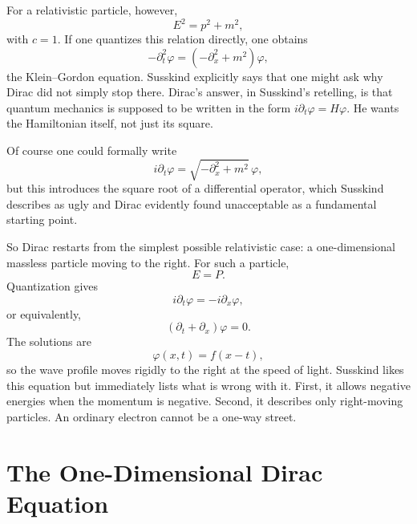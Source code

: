 For a relativistic particle, however,
\begin{equation}
E^2=p^2+m^2,
\end{equation}
with \(c=1\). If one quantizes this relation directly, one obtains
\begin{equation}
-\partial_t^2\varphi=\left(-\partial_x^2+m^2\right)\varphi,
\end{equation}
the Klein--Gordon equation. Susskind explicitly says that one might ask why Dirac did not simply stop there. Dirac's answer, in Susskind's retelling, is that quantum mechanics is supposed to be written in the form \(i\partial_t\varphi=H\varphi\). He wants the Hamiltonian itself, not just its square.

Of course one could formally write
\begin{equation}
i\partial_t\varphi=\sqrt{-\partial_x^2+m^2}\,\varphi,
\end{equation}
but this introduces the square root of a differential operator, which Susskind describes as ugly and Dirac evidently found unacceptable as a fundamental starting point.

So Dirac restarts from the simplest possible relativistic case: a one-dimensional massless particle moving to the right. For such a particle,
\begin{equation}
E=P.
\end{equation}
Quantization gives
\begin{equation}
i\partial_t\varphi=-i\partial_x\varphi,
\end{equation}
or equivalently,
\begin{equation}
(\partial_t+\partial_x)\varphi=0.
\end{equation}
The solutions are
\begin{equation}
\varphi(x,t)=f(x-t),
\end{equation}
so the wave profile moves rigidly to the right at the speed of light. Susskind likes this equation but immediately lists what is wrong with it. First, it allows negative energies when the momentum is negative. Second, it describes only right-moving particles. An ordinary electron cannot be a one-way street.

\section{The One-Dimensional Dirac Equation}

